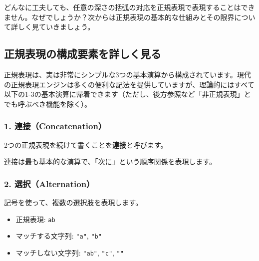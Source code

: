 どんなに工夫しても、任意の深さの括弧の対応を正規表現で表現することはできません。なぜでしょうか？次からは正規表現の基本的な仕組みとその限界について詳しく見ていきましょう。

\hypertarget{chapter4-ux6b63ux898fux8868ux73feux306eux69cbux6210ux8981ux7d20ux3092ux8a73ux3057ux304fux898bux308b}{%
\subsection{正規表現の構成要素を詳しく見る}\label{chapter4-ux6b63ux898fux8868ux73feux306eux69cbux6210ux8981ux7d20ux3092ux8a73ux3057ux304fux898bux308b}}

正規表現は、実は非常にシンプルな3つの基本演算から構成されています。現代の正規表現エンジンは多くの便利な記法を提供していますが、理論的にはすべて以下の1-3の基本演算に帰着できます（ただし、後方参照など「非正規表現」とでも呼ぶべき機能を除く）。

\hypertarget{chapter4-ux9023ux63a5concatenation}{%
\subsubsection{1.
連接（Concatenation）}\label{chapter4-ux9023ux63a5concatenation}}

2つの正規表現を続けて書くことを\textbf{連接}と呼びます。

\begin{Shaded}
\begin{Highlighting}[]
\end{Highlighting}
\end{Shaded}

連接は最も基本的な演算で、「次に」という順序関係を表現します。

\hypertarget{chapter4-ux9078ux629ealternation}{%
\subsubsection{2. 選択（Alternation）}\label{chapter4-ux9078ux629ealternation}}

\texttt{\textbar{}}記号を使って、複数の選択肢を表現します。

\begin{itemize}
\tightlist
\item
  正規表現: \texttt{a\textbar{}b}
\item
  マッチする文字列: \texttt{"a"}, \texttt{"b"}
\item
  マッチしない文字列: \texttt{"ab"}, \texttt{"c"}, \texttt{""}
\end{itemize}

